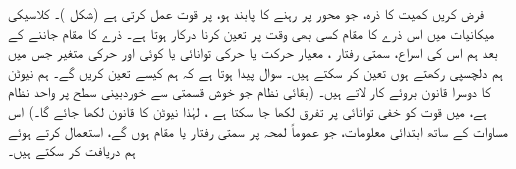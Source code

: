 فرض کریں  کمیت   کا ذرہ، جو   محور پر رہنے کا پابند ہو، پر قوت  عمل کرتی ہے  (شکل )۔ کلاسیکی میکانیات میں اس ذرے کا مقام   کسی بھی وقت  پر تعین کرنا درکار ہوتا ہے۔ ذرے کا مقام جاننے کے بعد ہم اس کی اسراع، سمتی رفتار  ، معیار حرکت   یا حرکی توانائی   یا کوئی اور حرکی متغیر جس میں ہم دلچسپی رکھتے ہوں تعین کر سکتے ہیں۔  سوال پیدا ہوتا ہے کہ ہم  کیسے تعین  کریں گے۔ ہم نیوٹن کا دوسرا قانون    بروئے کار لاتے ہیں۔ (بقائی نظام جو خوش قسمتی سے خوردبینی سطح پر واحد نظام ہے، میں قوت کو خفی توانائی پر تفرق لکھا جا سکتا ہے ،  لہٰذا نیوٹن کا قانون   لکھا جائے گا۔)   اس مساوات کے ساتھ ابتدائی معلومات، جو عموماً لمحہ  پر سمتی رفتار یا مقام ہوں گے، استعمال کرتے ہوئے ہم   دریافت کر سکتے ہیں۔
 
